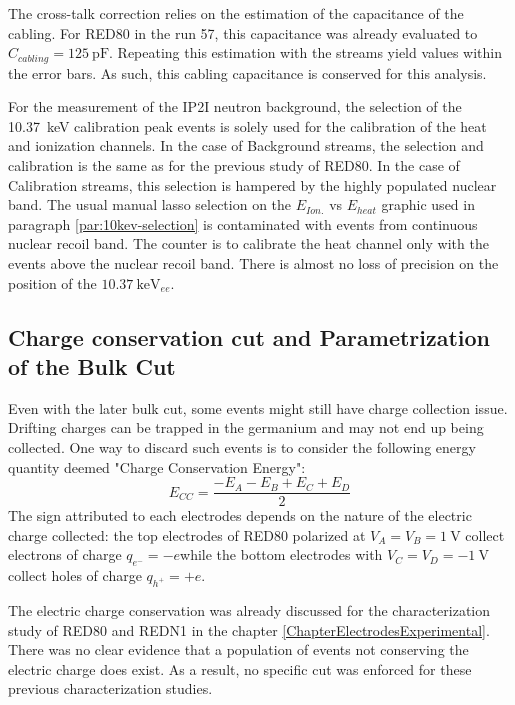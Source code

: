 The cross-talk correction relies on the estimation of the capacitance of the cabling. For RED80 in the run 57, this capacitance was already evaluated to  $C_{cabling} = \SI{125}{\pico\farad}$. Repeating this estimation with the streams yield values within the error bars. As such, this cabling capacitance is conserved for this analysis.

For the measurement of the IP2I neutron background, the selection of the \SI{10.37}{\kilo\eV} calibration peak events  is solely used for the calibration of the heat and ionization channels.
In the case of Background streams, the selection and calibration is the same as for the previous study of RED80.
In the case of Calibration streams, this selection is hampered by the highly populated nuclear band. The usual manual lasso selection on the $E_{Ion.}$ vs $E_{heat}$ graphic used in paragraph \ref{par:10kev-selection} is contaminated with events from  continuous nuclear recoil band. The counter is to calibrate the heat channel only with the events above the nuclear recoil band. There is almost no loss of precision on the position of the $\SI{10.37}{\kilo\eV}_{ee}$. 


\subsection{Charge conservation cut and Parametrization of the Bulk Cut}
\label{par:charge-conservation-cut}
\label{par:param-bulk-cut}

Even with the later bulk cut, some events might still have charge collection issue. Drifting charges can be trapped in the germanium and may not end up being collected. One way to discard such events is to consider the following energy quantity deemed "Charge Conservation Energy":
\begin{equation}
E_{CC} = \frac{-E_A-E_B+E_C+E_D}{2}
\end{equation}
The sign attributed to each electrodes depends on the nature of the electric charge collected: the top electrodes of RED80 polarized at $V_A = V_B = \SI{1}{\volt}$ collect electrons of charge $q_{e^-} = -e$while the bottom electrodes with $V_C = V_D = \SI{-1}{\volt}$ collect holes of charge $q_{h^+} = +e$.

The electric charge conservation was already discussed for the characterization study of RED80 and REDN1 in the chapter \ref{ChapterElectrodesExperimental}. There was no clear evidence that a population of events not conserving the electric charge does exist. As a result, no specific cut was enforced for these previous characterization studies.

